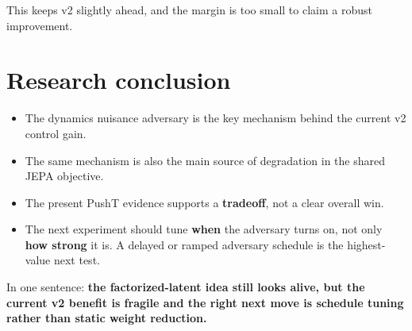 \documentclass[11pt]{article}
\begin{document}
This keeps v2 slightly ahead, and the margin is too small to claim a robust improvement.

\section*{Research conclusion}
\begin{itemize}[leftmargin=1.2em, itemsep=0.2em, topsep=0.2em]
  \item The dynamics nuisance adversary is the key mechanism behind the current v2 control gain.
  \item The same mechanism is also the main source of degradation in the shared JEPA objective.
  \item The present PushT evidence supports a \textbf{tradeoff}, not a clear overall win.
  \item The next experiment should tune \textbf{when} the adversary turns on, not only \textbf{how strong} it is. A delayed or ramped adversary schedule is the highest-value next test.
\end{itemize}

In one sentence: \textbf{the factorized-latent idea still looks alive, but the current v2 benefit is fragile and the right next move is schedule tuning rather than static weight reduction.}
\end{document}
